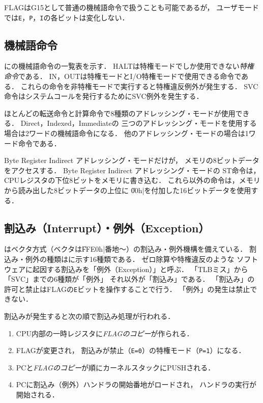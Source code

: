 FLAGはG15として普通の機械語命令で扱うことも可能であるが，
ユーザモードでは\texttt{E}，\texttt{P}，\texttt{I}の各ビットは変化しない．

\subsection{機械語命令}
に{\tac}の機械語命令の一覧表を示す．
HALTは特権モードでしか使用できない\emph{特権命令}である．
IN，OUTは特権モードとI/O特権モードで使用できる命令である．
これらの命令を非特権モードで実行すると特権違反例外が発生する．
SVC命令はシステムコールを発行するためにSVC例外を発生する．

ほとんどの転送命令と計算命令で8種類のアドレッシング・モードが使用できる．
Direct，Indexed，Immediateの
三つのアドレッシング・モードを使用する場合は2ワードの機械語命令になる．
他のアドレッシング・モードの場合は1ワード命令である．

Byte Register Indirect アドレッシング・モードだけが，
メモリの8ビットデータをアクセスする．
Byte Register Indirect アドレッシング・モードの
ST命令は，CPUレジスタの下位8ビットをメモリに書き込む．
これら以外の命令は，メモリから読み出した8ビットデータの上位に
\|00h|を付加した16ビットデータを使用する．

\subsection{割込み（Interrupt）・例外（Exception）}
{\tac}はベクタ方式（ベクタは\|FFE0h|番地〜）の割込み・例外機構を備えている．
割込み・例外の種類はに示す16種類である．
ゼロ除算や特権違反のような
ソフトウェアに起因する割込みを「例外（Exception）」と呼ぶ．
「TLBミス」から「SVC」までの6種類が「例外」 それ以外が「割込み」である．
「割込み」の許可と禁止はFLAGの\texttt{E}ビットを操作することで行う．
「例外」の発生は禁止できない．

割込みが発生すると次の順で割込み処理が行われる．
\begin{enumerate}
\item CPU内部の一時レジスタに\emph{FLAGのコピー}が作られる．
\item FLAGが変更され，
割込みが禁止（\texttt{E=0}）の特権モード（\texttt{P=1}）になる．
\item PCと\emph{FLAGのコピー}が順にカーネルスタックにPUSHされる．
\item PCに割込み（例外）ハンドラの開始番地がロードされ，
ハンドラの実行が開始される．
\end{enumerate}


